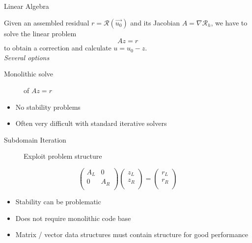 \documentclass[aspectratio=169,11pt]{beamer}
\theoremstyle{definition}
\begin{document}
\begin{frame}{Linear Algebra}

    Given an assembled residual $r = \mathcal{R}(\vec{u_0})$ and its Jacobian $A = \nabla\mathcal{R}_h$, we have to solve the linear problem
    \begin{equation*}
      A z = r
    \end{equation*}
    to obtain a correction and calculate $u = u_0 - z$.\\
  \emph{Several options}
  \begin{description}
  \item[Monolithic solve] of $A z = r$
  \end{description}
  \begin{itemize}
  \item No stability problems
  \item Often very difficult with standard iterative solvers
  \end{itemize}
  \begin{description}
  \item[Subdomain Iteration] Exploit problem structure
  \end{description}
\begin{equation*}
  \begin{pmatrix}
    A_L & 0 \\
    0  & A_R \\
  \end{pmatrix}
  \begin{pmatrix}
    z_L \\ z_R \\
  \end{pmatrix}
  =
  \begin{pmatrix}
    r_L \\ r_R \\
  \end{pmatrix}
\end{equation*}
\begin{itemize}
\item Stability can be problematic
\item Does not require monolithic code base
\item Matrix / vector data structures must contain structure for good performance
\end{itemize}
\end{frame}
\end{document}
